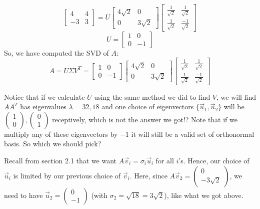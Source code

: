 \documentclass{article}
\begin{document}
$$\begin{bmatrix}4& 4\\-3& 3\end{bmatrix} = U \begin{bmatrix}4\sqrt{2}& 0\\0& 3\sqrt{2}\end{bmatrix}
\begin{bmatrix}\frac{1}{\sqrt{2}}&\frac{1}{\sqrt{2}}\\\frac{1}{\sqrt{2}}&\frac{-1}{\sqrt{2}}\end{bmatrix}$$
$$U = \begin{bmatrix}1& 0\\0& -1\end{bmatrix}$$
So, we have computed the SVD of $A$:
$$A = U \Sigma V^T = \begin{bmatrix}1& 0\\0& -1\end{bmatrix}
\begin{bmatrix}4\sqrt{2}& 0\\0& 3\sqrt{2}\end{bmatrix}
\begin{bmatrix}\frac{1}{\sqrt{2}}&\frac{1}{\sqrt{2}}\\\frac{1}{\sqrt{2}}&\frac{-1}{\sqrt{2}}\end{bmatrix}$$

Notice that if we calculate $U$ using the same method we did to find $V$, we will find $AA^T$ has eigenvalues $\lambda = 32, 18$ and one choice of eigenvectors $\{ \vec{u}_1, \vec{u}_2 \}$  will be $\begin{pmatrix}  1 \\ 0 \end{pmatrix}, \begin{pmatrix}  0 \\ 1 \end{pmatrix}$ receptively, which is not the answer we got!? Note that if we multiply any of these eigenvectors by $-1$ it will still be a valid set of orthonormal basis. So which we should pick?

Recall from section 2.1 that we want $ A \vec{v}_i = \sigma_i \vec{u}_i$ for all $i$'s. Hence, our choice of $\vec{u}_i$ is limited by our previous choice of $\vec{v}_i$. Here, since $A\vec{v}_2= \begin{pmatrix} 0 \\  -3 \sqrt{2} \end{pmatrix}$, we need to have $\vec{u}_2 = \begin{pmatrix}   0 \\ -1 \end{pmatrix}$ (with $\sigma_2 = \sqrt{18} = 3 \sqrt{2}$), like what we got above.
\end{document}
